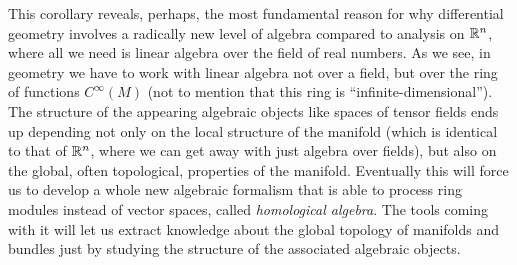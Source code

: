 \begin{rem}
    This corollary reveals, perhaps, the most fundamental reason for why differential geometry involves a radically new level of algebra compared to analysis on $\mathbb{R}^n$, where all we need is linear algebra over the field of real numbers. As we see, in geometry we have to work with linear algebra not over a field, but over the ring of functions $C^\infty(M)$ (not to mention that this ring is ``infinite-dimensional''). The structure of the appearing algebraic objects like spaces of tensor fields ends up depending not only on the local structure of the manifold (which is identical to that of $\mathbb{R}^n$, where we can get away with just algebra over fields), but also on the global, often topological, properties of the manifold. Eventually this will force us to develop a whole new algebraic formalism that is able to process ring modules instead of vector spaces, called \emph{homological algebra}. The tools coming with it will let us extract knowledge about the global topology of manifolds and bundles just by studying the structure of the associated algebraic objects.
\end{rem}


